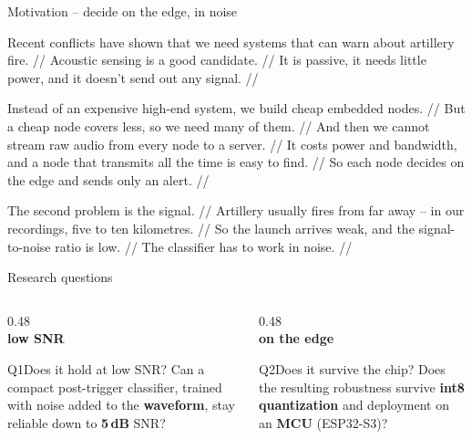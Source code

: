 \documentclass[aspectratio=169,10pt]{beamer}
\begin{document}
\begin{frame}{Motivation -- decide on the edge, in noise}
{    Recent conflicts have shown that we need systems that can warn about artillery
    fire. // Acoustic sensing is a good candidate. // It is passive, it needs little
    power, and it doesn't send out any signal. //\par\medskip
    Instead of an expensive high-end system, we build cheap embedded nodes. // But a
    cheap node covers less, so we need many of them. // And then we cannot stream raw
    audio from every node to a server. // It costs power and bandwidth, and a node that
    transmits all the time is easy to find. // So each node decides on the edge and
    sends only an alert. //\par\medskip
    The second problem is the signal. // Artillery usually fires from far away -- in our
    recordings, five to ten kilometres. // So the launch arrives weak, and the signal-to-noise
    ratio is low. // The classifier has to work in noise. //
  }
\end{frame}

\begin{frame}{Research questions}
  \vfill
  \begin{columns}[T,onlytextwidth]
    \begin{column}{0.48\textwidth}
      \centering{\color{ctublue}\LARGE\faWaveSquare}\\[1mm]
      {\small\bfseries low SNR}\par\vspace{2mm}
      \begin{block}{Q1\enspace Does it hold at low SNR?}
        \small
        Can a compact post-trigger classifier, trained with noise added to the
        \textbf{waveform}, stay reliable down to \textbf{5\,dB} SNR?
      \end{block}
    \end{column}
    \begin{column}{0.48\textwidth}
      \centering{\color{ctublue}\LARGE\faMicrochip}\\[1mm]
      {\small\bfseries on the edge}\par\vspace{2mm}
      \begin{block}{Q2\enspace Does it survive the chip?}
        \small
        Does the resulting robustness survive \textbf{int8 quantization} and deployment
        on an \textbf{MCU} (ESP32-S3)?
      \end{block}
    \end{column}
  \end{columns}
  \vfill
\end{frame}
\end{document}
